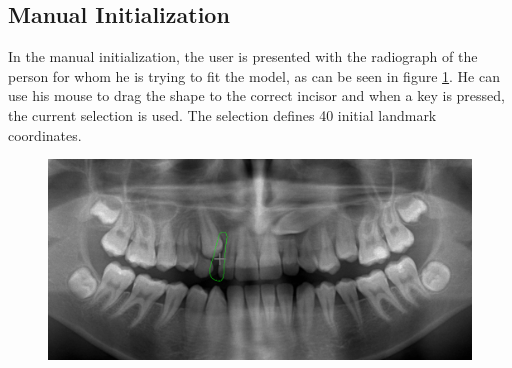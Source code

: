 \documentclass[11pt]{article}
\begin{document}
\subsection{Manual Initialization}
In the manual initialization, the user is presented with the radiograph of the person for whom he is trying to fit the model, as can be seen in figure \ref{fig:manual}. He can use his mouse to drag the shape to the correct incisor and when a key is pressed, the current selection is used. The selection defines 40 initial landmark coordinates.
\begin{figure}[H]
  \centering
  \includegraphics[width=\linewidth]{manual_init}
  \label{fig:manual}
\end{figure}
\newpage
\end{document}
